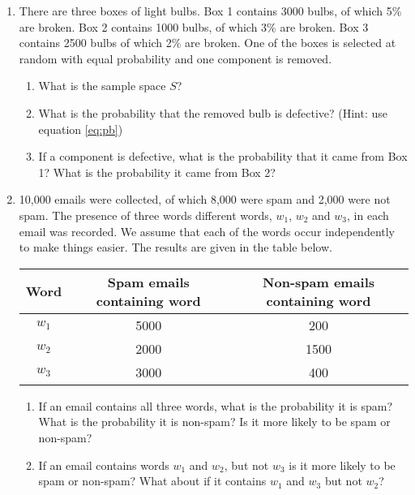 {\begin{enumerate}
  \item There are three boxes of light bulbs. Box 1 contains 3000 bulbs, of which 5\% are broken. Box 2 contains 1000 bulbs, of which 3\% are broken. Box 3 contains 2500 bulbs of which 2\% are broken. One of the boxes is selected at random with equal probability and one component is removed.
  \begin{enumerate}
  \item What is the sample space $S$?
  \item What is the probability that the removed bulb is defective? (Hint: use equation \eqref{eq:pb})
  \item If a component is defective, what is the probability that it came from Box 1? What is the probability it came from Box 2?
  \end{enumerate}
  
 \item 10,000 emails were collected, of which 8,000 were spam and 2,000 were not spam. The presence of three words different words, $w_{1}$, $w_{2}$ and $w_{3}$, in each email was recorded. We assume that each of the words occur independently to make things easier. The results are given in the table below. \\
 \begin{center}
 \begin{tabular}{|c|c|c|}
 \hline
  Word & Spam emails containing word & Non-spam emails containing word\\ \hline
  $w_{1}$ & 5000 & 200 \\ \hline
  $w_{2}$ & 2000 & 1500 \\ \hline
  $w_{3}$ & 3000 & 400 \\ \hline
 \end{tabular}
\end{center}
\begin{enumerate}
\item If an email contains all three words, what is the probability it is spam? What is the probability it is non-spam? Is it more likely to be spam or non-spam?
\item If an email contains words $w_{1}$ and $w_{2}$, but not $w_{3}$ is it more likely to be spam or non-spam? What about if it contains $w_{1}$ and $w_{3}$ but not $w_{2}$?
\end{enumerate}
\end{enumerate}
}

